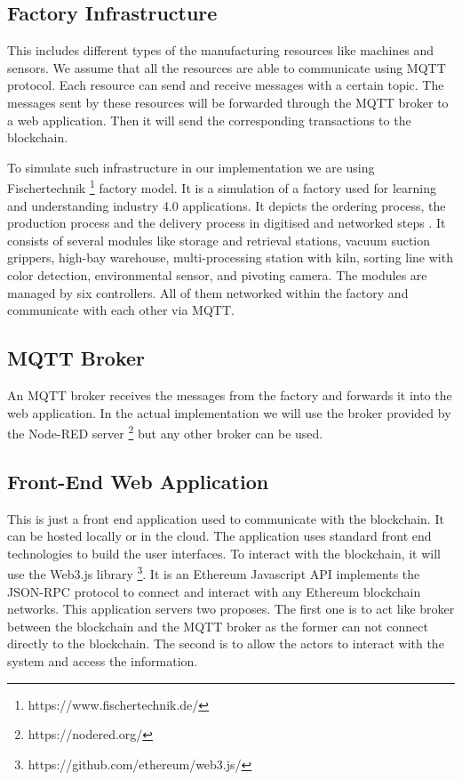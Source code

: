 \documentclass[runningheads]{llncs}
\begin{document}
\subsection{Factory Infrastructure}
This includes different types of the manufacturing resources like machines and sensors. We assume that all the resources are able to communicate using MQTT protocol. Each resource can send and receive messages with a certain topic. The messages sent by these resources will be forwarded through the MQTT broker to a web application. Then it will send the corresponding transactions to the blockchain.

\bigbreak

\noindent To simulate such infrastructure in our implementation we are using Fischertechnik \footnote{https://www.fischertechnik.de/} factory model. It is a simulation of a factory used for learning and understanding industry 4.0 applications. It depicts the ordering process, the production process and the delivery process in digitised and networked steps \cite{Industry}. It consists of several modules like storage and retrieval stations, vacuum suction grippers, high-bay warehouse, multi-processing station with kiln, sorting line with color detection, environmental sensor, and pivoting camera. The modules are managed by six controllers. All of them networked within the factory and communicate with each other via MQTT.


\subsection{MQTT Broker}
An MQTT broker receives the messages from the factory and forwards it into the web application. In the actual implementation we will use the broker provided by the Node-RED server \footnote{https://nodered.org/} but any other broker can be used.

\subsection{Front-End Web Application}
This is just a front end application used to communicate with the blockchain. It can be hosted locally or in the cloud. The application uses standard front end technologies to build the user interfaces. To interact with the blockchain, it will use the Web3.js library \footnote{https://github.com/ethereum/web3.js/}. It is an Ethereum Javascript API implements the JSON-RPC protocol to connect and interact with any Ethereum blockchain networks. This application servers two proposes. The first one is to act like broker between the blockchain and the MQTT broker as the former can not connect directly to the blockchain. The second is to allow the actors to interact with the system and access the information. 
\end{document}
